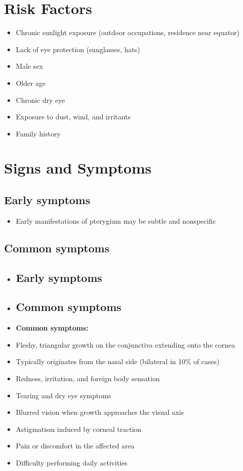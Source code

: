 \section{Risk Factors}

\begin{itemize}[noitemsep]
  \item Chronic sunlight exposure (outdoor occupations, residence near equator)
  \item Lack of eye protection (sunglasses, hats)
  \item Male sex
  \item Older age
  \item Chronic dry eye
  \item Exposure to dust, wind, and irritants
  \item Family history
\end{itemize}

\section{Signs and Symptoms}

\subsection{Early symptoms}
\begin{itemize}[noitemsep]
  \item Early manifestations of pterygium may be subtle and nonspecific
\end{itemize}

\subsection{Common symptoms}
\begin{itemize}[noitemsep]
  \item \subsection{Early symptoms}
  \item \subsection{Common symptoms}
  \item \textbf{Common symptoms:}
  \item Fleshy, triangular growth on the conjunctiva extending onto the cornea
  \item Typically originates from the nasal side (bilateral in 10\% of cases)
  \item Redness, irritation, and foreign body sensation
  \item Tearing and dry eye symptoms
  \item Blurred vision when growth approaches the visual axis
  \item Astigmatism induced by corneal traction
  \item Pain or discomfort in the affected area
  \item Difficulty performing daily activities
\end{itemize}

